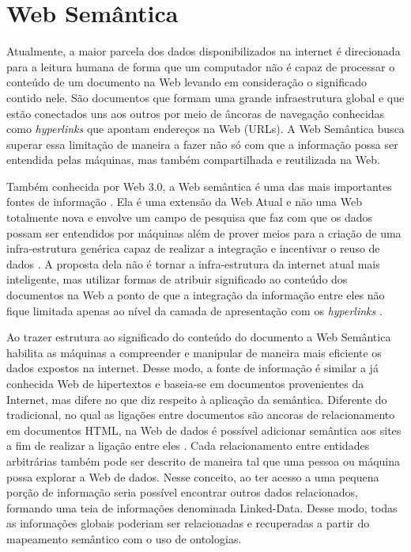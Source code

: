 \chapter{Web Semântica}
\label{cap:websemantica}

Atualmente, a maior parcela dos dados disponibilizados na internet é direcionada para a leitura humana \citep{Berners-lee2001} de forma que um computador não é capaz de processar o conteúdo de um documento na Web levando em consideração o significado contido nele. São documentos que formam uma grande infraestrutura global e que estão conectados uns aos outros por meio de âncoras de navegação conhecidas como \emph{hyperlinks} que apontam endereços na Web (URLs). A Web Semântica busca superar essa limitação de maneira a fazer não só com que a informação possa ser entendida pelas máquinas, mas também compartilhada e reutilizada na Web.

Também conhecida por Web 3.0, a Web semântica é uma das mais importantes fontes de informação \citep{Berners-lee2001}. Ela é uma extensão da Web Atual e não uma Web totalmente nova \citep{Yong-gui2010} e envolve um campo de pesquisa que faz com que os dados possam ser entendidos por máquinas \citep{Stumme2006} além de prover meios para a criação de uma infra-estrutura genérica capaz de realizar a integração e incentivar o reuso de dados \citep{Bojars2008}. A proposta dela não é tornar a infra-estrutura da internet atual mais inteligente, mas utilizar formas de atribuir significado ao conteúdo dos documentos na Web a ponto de que a integração da informação entre eles não fique limitada apenas ao nível da camada de apresentação com os \emph{hyperlinks} \citep{Allemang2011}. 

Ao trazer estrutura ao significado do conteúdo do documento a Web Semântica habilita as máquinas a compreender e manipular de maneira mais eficiente os dados expostos na internet. Desse modo, a fonte de informação é similar a já conhecida Web de hipertextos e baseia-se em documentos provenientes da Internet, mas difere no que diz respeito à aplicação da semântica. Diferente do tradicional, no qual as ligações entre documentos são ancoras de relacionamento em documentos HTML, na Web de dados é possível adicionar semântica aos sites a fim de realizar a ligação entre eles \citep{Bojars2008}. Cada relacionamento entre entidades arbitrárias também pode ser descrito de maneira tal que uma pessoa ou máquina possa explorar a Web de dados. Nesse conceito, ao ter acesso a uma pequena porção de informação seria possível encontrar outros dados relacionados, formando uma teia de informações denominada Linked-Data. Desse modo, todas as informações globais poderiam ser relacionadas e recuperadas a partir do mapeamento semântico com o uso de ontologias. 


